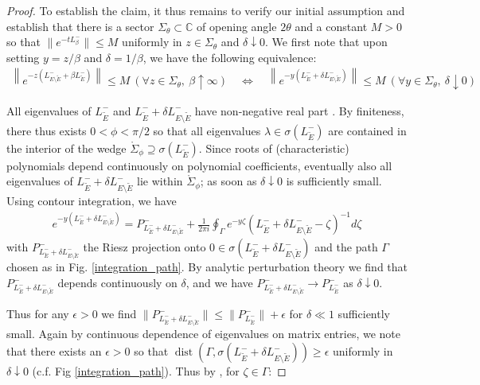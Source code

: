 \documentclass[reqno,12pt,letterpaper]{amsart}
\numberwithin{equation}{section}
\newcommand{\Lin}{L^{-}}
\newcommand{\dist}{{\operatorname{dist}}}
\newcommand{\1}{\mathds{1}}
\theoremstyle{definition}
\begin{document}
\begin{proof}
	
	
	
	
	
	
		To establish the claim, it thus remains to verify our initial assumption and establish that there is a sector $\Sigma_\theta \subset \mathds{C}$ of opening angle $2\theta$ and a constant $M>0$ so that $\|e^{-t\Lin_\beta}\| \leq M$ uniformly in $z \in \Sigma_\theta$ and  $\delta \downarrow 0$. We first note that upon setting $y = z/\beta$ and $\delta = 1/\beta$, we have the following equivalence:
	\begin{align}
		\left\|e^{-z(\Lin_{E\setminus \tilde{E}} + \beta \Lin_{\tilde{E}})}\right\| \leq M\ (\forall z \in \Sigma_\theta,\ \beta \uparrow \infty)
		\quad \Leftrightarrow \quad 
		\left\|e^{-y(\Lin_{\tilde{E}} + \delta \Lin_{E\setminus \tilde{E}})}\right\| \leq M\ (\forall y \in \Sigma_\theta,\ \delta \downarrow 0)
	\end{align}
	
	
	All eigenvalues of $\Lin_{\tilde{E}}$ and $\Lin_{\tilde{E}} + \delta \Lin_{E\setminus \tilde{E}}$ have non-negative real part \cite{Veerman2020APO}. By finiteness, there thus exists $0< \phi < \pi/2$ so that all eigenvalues $\lambda \in \sigma(\Lin_{\tilde{E}})$ are contained in the interior of the wedge  $\mathring{\Sigma}_\phi \supseteq \sigma(\Lin_{\tilde{E}})$.  Since roots of (characteristic) polynomials depend continuously on polynomial coefficients,  eventually  also  all eigenvalues of $\Lin_{\tilde{E}} + \delta \Lin_{E\setminus \tilde{E}}$ lie within $\mathring{\Sigma}_\phi$; as soon as $\delta \downarrow 0$ is sufficiently small. 
	Using contour integration, we have
	\begin{align}
			e^{-y(\Lin_{\tilde{E}} + \delta \Lin_{E\setminus \tilde{E}})} = P^-_{\Lin_{\tilde{E}} + \delta \Lin_{E\setminus \tilde{E}}} + \frac{1}{2 \pi i}\oint_\Gamma e^{-y\zeta}\left(\Lin_{\tilde{E}} + \delta \Lin_{E\setminus \tilde{E}} - \zeta\right)^{-1} d\zeta
	\end{align}
with $P^-_{\Lin_{\tilde{E}} + \delta \Lin_{E\setminus \tilde{E}}}$ the Riesz projection onto $0 \in \sigma(\Lin_{\tilde{E}} + \delta \Lin_{E\setminus \tilde{E}})$ and the path $\Gamma$ chosen as in Fig. \ref{integration_path}. By analytic perturbation theory  \cite[Chapter II]{kato1995perturbation}
	we find that $P^-_{\Lin_{\tilde{E}} + \delta \Lin_{E\setminus \tilde{E}}}$ depends continuously on $\delta$, and we have $P^-_{\Lin_{\tilde{E}} + \delta \Lin_{E\setminus \tilde{E}}} \rightarrow P^-_{\Lin_{\tilde{E}}}$ as $\delta \downarrow 0$.
	
	
		\noindent		\begin{minipage}[b]{0.7\textwidth}
 Thus for any $\epsilon > 0$  we find $\|P^-_{\Lin_{\tilde{E}} + \delta \Lin_{E\setminus \tilde{E}}}\| \leq  \|P^-_{\Lin_{\tilde{E}} }\|  + \epsilon$ for $\delta \ll 1$ sufficiently small.  Again by continuous dependence of eigenvalues on matrix entries, we note that there exists an $ \epsilon > 0$ so that 
$
\dist(\Gamma, \sigma(\Lin_{\tilde{E}} + \delta \Lin_{E\setminus \tilde{E}})) 
\geq \epsilon
$ uniformly in $\delta \downarrow 0$ (c.f. Fig \ref{integration_path}).
Thus by \cite[Theorem 4.1]{Bandtlow2003},  for
$\zeta \in \Gamma$:


\end{minipage}
\end{proof}
\end{document}
